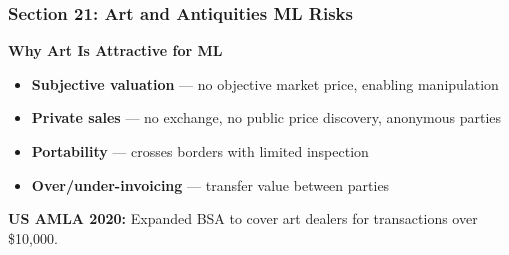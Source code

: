 \documentclass[12pt,aspectratio=169]{beamer}
\renewcommand{\scriptsize}{\fontsize{5}{6}\selectfont}
\begin{document}
	\begin{frame}
		\frametitle{\fontsize{13}{15}\selectfont \textbf{Section 21: Art and Antiquities ML Risks}}
		\vspace{0.3cm}
		\begin{center}
			{\fontsize{12}{14}\selectfont \textbf{Why Art Is Attractive for ML}}
		\end{center}
		\vspace{0.2cm}
		\begin{block}{}
			\scriptsize
			\begin{itemize}
				\item \textbf{Subjective valuation} — no objective market price, enabling manipulation
				\item \textbf{Private sales} — no exchange, no public price discovery, anonymous parties
				\item \textbf{Portability} — crosses borders with limited inspection
				\item \textbf{Over/under-invoicing} — transfer value between parties
			\end{itemize}
			\vspace{0.1cm}
			\textbf{US AMLA 2020:} Expanded BSA to cover art dealers for transactions over \$10,000.
		\end{block}
	\end{frame}
	
\end{document}
